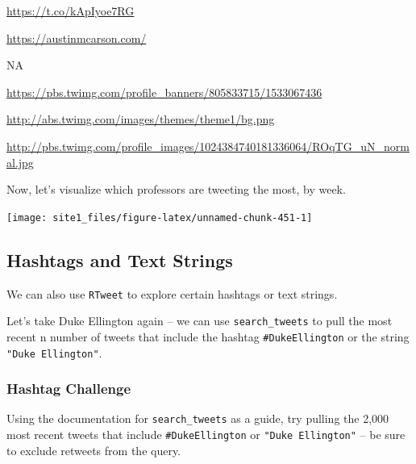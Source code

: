 \documentclass[]{book}
\newenvironment{Shaded}{\begin{snugshade}}{\end{snugshade}}
\newcommand{\KeywordTok}[1]{\textcolor[rgb]{0.13,0.29,0.53}{\textbf{#1}}}
\newcommand{\DataTypeTok}[1]{\textcolor[rgb]{0.13,0.29,0.53}{#1}}
\newcommand{\StringTok}[1]{\textcolor[rgb]{0.31,0.60,0.02}{#1}}
\newcommand{\OperatorTok}[1]{\textcolor[rgb]{0.81,0.36,0.00}{\textbf{#1}}}
\newcommand{\NormalTok}[1]{#1}
\begin{document}
\url{https://t.co/kApIyoe7RG}

\url{https://austinmcarson.com/}

NA

\url{https://pbs.twimg.com/profile_banners/805833715/1533067436}

\url{http://abs.twimg.com/images/themes/theme1/bg.png}

\url{http://pbs.twimg.com/profile_images/1024384740181336064/ROqTG_uN_normal.jpg}

Now, let's visualize which professors are tweeting the most, by week.

\begin{Shaded}
\end{Shaded}

\begin{center}\texttt{[image: site1\_files/figure-latex/unnamed-chunk-451-1]} \end{center}

\subsection{Hashtags and Text Strings}\label{hashtags-and-text-strings}

We can also use \texttt{RTweet} to explore certain hashtags or text
strings.

Let's take Duke Ellington again -- we can use \texttt{search\_tweets} to
pull the most recent n number of tweets that include the hashtag
\texttt{\#DukeEllington} or the string \texttt{"Duke\ Ellington"}.

\subsubsection*{Hashtag Challenge}\label{hashtag-challenge}

Using the documentation for \texttt{search\_tweets} as a guide, try
pulling the 2,000 most recent tweets that include
\texttt{\#DukeEllington} or \texttt{"Duke\ Ellington"} -- be sure to
exclude retweets from the query.
\end{document}
